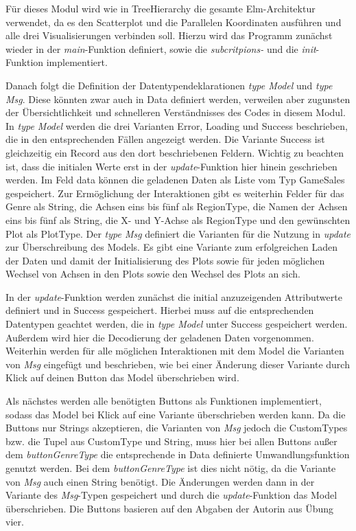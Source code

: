 \documentclass[usegeometry=true]{scrartcl}
\begin{document}
Für dieses Modul wird wie in TreeHierarchy die gesamte Elm-Architektur verwendet, da es den Scatterplot und die Parallelen Koordinaten ausführen und alle drei Visualisierungen verbinden soll.
Hierzu wird das Programm zunächst wieder in der \textit{main}-Funktion definiert, sowie die \textit{subcritpions-} und die \textit{init}-Funktion implementiert.

Danach folgt die Definition der Datentypendeklarationen \textit{type Model} und \textit{type Msg}. 
Diese könnten zwar auch in Data definiert werden, verweilen aber zugunsten der Übersichtlichkeit und schnelleren Verständnisses des Codes in diesem Modul.
In \textit{type Model} werden die drei Varianten Error, Loading und Success beschrieben, die in den entsprechenden Fällen angezeigt werden. 
Die Variante Success ist gleichzeitig ein Record aus den dort beschriebenen Feldern. 
Wichtig zu beachten ist, dass die initialen Werte erst in der \textit{update}-Funktion hier hinein geschrieben werden.
Im Feld data können die geladenen Daten als Liste vom Typ GameSales gespeichert. 
Zur Ermöglichung der Interaktionen gibt es weiterhin Felder für das Genre als String, die Achsen eins bis fünf als RegionType, die Namen der Achsen eins bis fünf als String, die X- und Y-Achse als RegionType und den gewünschten Plot als PlotType.
Der \textit{type Msg} definiert die Varianten für die Nutzung in \textit{update} zur Überschreibung des Models. 
Es gibt eine Variante zum erfolgreichen Laden der Daten und damit der Initialisierung des Plots sowie für jeden möglichen Wechsel von Achsen in den Plots sowie den Wechsel des Plots an sich.

In der \textit{update}-Funktion werden zunächst die initial anzuzeigenden Attributwerte definiert und in Success gespeichert. 
Hierbei muss auf die entsprechenden Datentypen geachtet werden, die in \textit{type Model} unter Success gespeichert werden. 
Außerdem wird hier die Decodierung der geladenen Daten vorgenommen. 
Weiterhin werden für alle möglichen Interaktionen mit dem Model die Varianten von \textit{Msg} eingefügt und beschrieben, wie bei einer Änderung dieser Variante durch Klick auf deinen Button das Model überschrieben wird.

Als nächstes werden alle benötigten Buttons als Funktionen implementiert, sodass das Model bei Klick auf eine Variante überschrieben werden kann. 
Da die Buttons nur Strings akzeptieren, die Varianten von \textit{Msg} jedoch die CustomTypes bzw. die Tupel aus CustomType und String, muss hier bei allen Buttons außer dem \textit{buttonGenreType} die entsprechende in Data definierte Umwandlungsfunktion genutzt werden. 
Bei dem \textit{buttonGenreType} ist dies nicht nötig, da die Variante von \textit{Msg} auch einen String benötigt.
Die Änderungen werden dann in der Variante des \textit{Msg}-Typen gespeichert und durch die \textit{update}-Funktion das Model überschrieben.
Die Buttons basieren auf den Abgaben der Autorin aus Übung vier.
\end{document}
